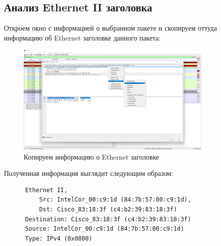 \documentclass[a4paper]{article}
\begin{document}
  \subsection{Анализ Ethernet II заголовка}

  Откроем окно с информацией о выбранном пакете и скопируем оттуда информацию 
  об Ethernet заголовке данного пакета:

  \begin{figure}[H]
    \centering 
    \includegraphics[width=0.85\textwidth]{03_0006}
    \caption{Копируем информацию о Ethernet заголовке}
    \label{img:0006}
  \end{figure}

  Полученная информация выглядит следующим образом:

  \begin{listing}[H]
    \begin{verbatim}
      Ethernet II, 
          Src: IntelCor_00:c9:1d (84:7b:57:00:c9:1d),
          Dst: Cisco_83:18:3f (c4:b2:39:83:18:3f)
      Destination: Cisco_83:18:3f (c4:b2:39:83:18:3f)
      Source: IntelCor_00:c9:1d (84:7b:57:00:c9:1d)
      Type: IPv4 (0x0800)
    \end{verbatim}  
  \end{listing}
\end{document}
